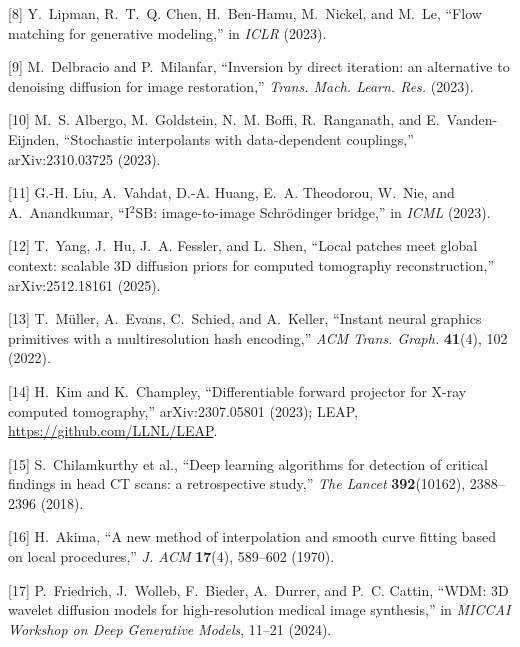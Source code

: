 \documentclass[11pt]{article}
\begin{document}
[8] Y.~Lipman, R.~T.~Q. Chen, H.~Ben-Hamu, M.~Nickel, and M.~Le, ``Flow matching for generative modeling,'' in \emph{ICLR} (2023).


[9] M.~Delbracio and P.~Milanfar, ``Inversion by direct iteration: an alternative to denoising diffusion for image restoration,'' \emph{Trans. Mach. Learn. Res.} (2023).


[10] M.~S. Albergo, M.~Goldstein, N.~M. Boffi, R.~Ranganath, and E.~Vanden-Eijnden, ``Stochastic interpolants with data-dependent couplings,'' arXiv:2310.03725 (2023).


[11] G.-H. Liu, A.~Vahdat, D.-A. Huang, E.~A. Theodorou, W.~Nie, and A.~Anandkumar, ``I$^2$SB: image-to-image Schr\"odinger bridge,'' in \emph{ICML} (2023).


[12] T.~Yang, J.~Hu, J.~A. Fessler, and L.~Shen, ``Local patches meet global context: scalable 3D diffusion priors for computed tomography reconstruction,'' arXiv:2512.18161 (2025).


[13] T.~M\"uller, A.~Evans, C.~Schied, and A.~Keller, ``Instant neural graphics primitives with a multiresolution hash encoding,'' \emph{ACM Trans. Graph.} \textbf{41}(4), 102 (2022).


[14] H.~Kim and K.~Champley, ``Differentiable forward projector for X-ray computed tomography,'' arXiv:2307.05801 (2023); LEAP, \url{https://github.com/LLNL/LEAP}.


[15] S.~Chilamkurthy et al., ``Deep learning algorithms for detection of critical findings in head CT scans: a retrospective study,'' \emph{The Lancet} \textbf{392}(10162), 2388--2396 (2018).


[16] H.~Akima, ``A new method of interpolation and smooth curve fitting based on local procedures,'' \emph{J. ACM} \textbf{17}(4), 589--602 (1970).


[17] P.~Friedrich, J.~Wolleb, F.~Bieder, A.~Durrer, and P.~C. Cattin, ``WDM: 3D wavelet diffusion models for high-resolution medical image synthesis,'' in \emph{MICCAI Workshop on Deep Generative Models}, 11--21 (2024).
\end{document}
